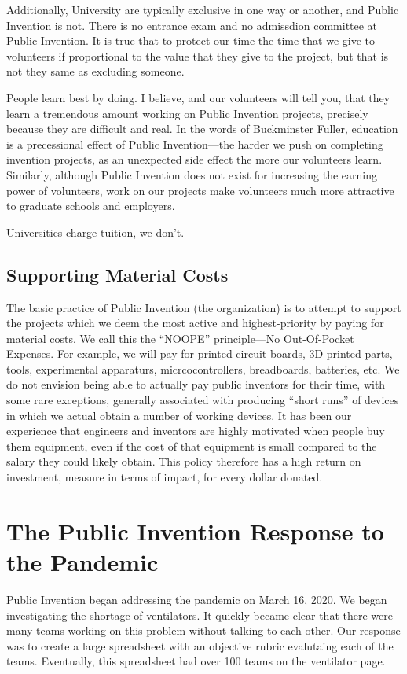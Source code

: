 \documentclass[
	fontsize=10pt, %
	twoside=false, %
	secnumdepth=1, %
]{kaobook}
\begin{document}
Additionally, University are typically exclusive in one way
or another, and Public Invention is not.
There is no entrance exam and no admissdion committee at Public Invention.
It is true that to protect our time the time that we give
to volunteers if proportional to the value that they give to the project,
but that is not they same as excluding someone.

People learn best by doing. I believe, and our volunteers
will tell you, that they learn a tremendous amount working
on Public Invention projects, precisely because they are difficult and real.
In the words of Buckminster Fuller, education is a precessional effect
of Public Invention---the harder we push on completing invention projects,
as an unexpected side effect the more our volunteers learn.
Similarly, although Public Invention does not exist for increasing the
earning power of volunteers, work on our projects make volunteers much more
attractive to graduate schools and employers.

Universities charge tuition, we don't.

\section{Supporting Material Costs}
\label{chp:material}

The basic practice of Public Invention (the organization) is to attempt to
support the projects which we deem the most active and highest-priority
by paying for material costs.
We call this the ``NOOPE'' principle---No Out-Of-Pocket Expenses.
For example, we will pay for printed circuit boards, 3D-printed parts, tools,
experimental apparaturs, micrcocontrollers, breadboards, batteries, etc.
We do not envision being able to actually pay public inventors for their
time, with some rare exceptions, generally associated with producing
``short runs'' of devices in which we actual obtain a number of working devices.
It has been our experience that engineers and inventors are highly motivated when people
buy them equipment, even if the cost of that equipment is small compared to the
salary they could likely obtain.
This policy therefore has a high return on investment, measure in terms of impact,
for every dollar donated.

\chapter{The Public Invention Response to the Pandemic}

Public Invention began addressing the pandemic on March 16, 2020.
We began investigating the shortage of ventilators.
It quickly became clear that there were many teams working on this
problem without talking to each other.
Our response was to create a large spreadsheet with an objective
rubric evalutaing each of the teams.
Eventually, this spreadsheet had over 100 teams on the ventilator
page.
\end{document}
